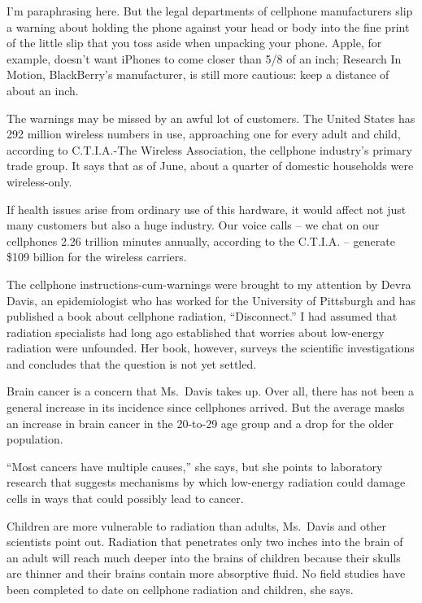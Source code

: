 ﻿\documentclass[12pt]{article}
\begin{document}
I'm paraphrasing here. But the legal departments of cellphone manufacturers slip a warning about
holding the phone against your head or body into the fine print of the little slip that you toss
aside when unpacking your phone. Apple, for example, doesn't want iPhones to come closer than 5/8 of
an inch; Research In Motion, BlackBerry's manufacturer, is still more cautious: keep a distance of
about an inch.

The warnings may be missed by an awful lot of customers. The United States has 292 million wireless
numbers in use, approaching one for every adult and child, according to C.T.I.A.-The Wireless
Association, the cellphone industry's primary trade group. It says that as of June, about a quarter
of domestic households were wireless-only.

If health issues arise from ordinary use of this hardware, it would affect not just many customers
but also a huge industry. Our voice calls -- we chat on our cellphones 2.26 trillion minutes
annually, according to the C.T.I.A. -- generate \$109 billion for the wireless carriers.

The cellphone instructions-cum-warnings were brought to my attention by Devra Davis, an
epidemiologist who has worked for the University of Pittsburgh and has published a book about
cellphone radiation, ``Disconnect.'' I had assumed that radiation specialists had long ago
established that worries about low-energy radiation were unfounded. Her book, however, surveys the
scientific investigations and concludes that the question is not yet settled.

Brain cancer is a concern that Ms.~Davis takes up. Over all, there has not been a general increase
in its incidence since cellphones arrived. But the average masks an increase in brain cancer in the
20-to-29 age group and a drop for the older population.

``Most cancers have multiple causes,'' she says, but she points to laboratory research that suggests
mechanisms by which low-energy radiation could damage cells in ways that could possibly lead to
cancer.

Children are more vulnerable to radiation than adults, Ms.~Davis and other scientists point out.
Radiation that penetrates only two inches into the brain of an adult will reach much deeper into the
brains of children because their skulls are thinner and their brains contain more absorptive fluid.
No field studies have been completed to date on cellphone radiation and children, she says.
\end{document}
